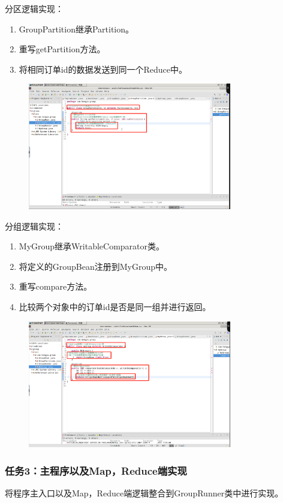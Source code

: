 \documentclass {article}
\begin{document}
				分区逻辑实现：
				\begin{enumerate}
					\item GroupPartition继承Partition。
					\item 重写getPartition方法。
					\item 将相同订单id的数据发送到同一个Reduce中。
				\end{enumerate}
				\begin{figure}[H]
					\centering
					\includegraphics[width=3.5in]{figures/fig22.jpg}
				\end{figure}
			
				分组逻辑实现：
				\begin{enumerate}
					\item MyGroup继承WritableComparator类。
					\item 将定义的GroupBean注册到MyGroup中。
					\item 重写compare方法。
					\item 比较两个对象中的订单id是否是同一组并进行返回。
				\end{enumerate}
				\begin{figure}[H]
					\centering
					\includegraphics[width=3.5in]{figures/fig23.jpg}
				\end{figure}
					
			\subsubsection{任务3：主程序以及Map，Reduce端实现}
				将程序主入口以及Map，Reduce端逻辑整合到GroupRunner类中进行实现。
				
\end{document}
